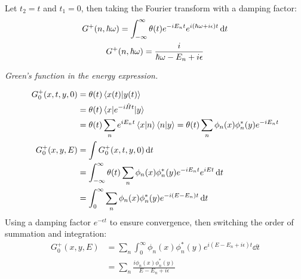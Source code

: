 \documentclass{report}
\begin{document}
\begin{subquests}
\begin{subquests}
		\item Let $t_2 = t$ and $t_1 = 0$, then taking the Fourier transform with a damping factor:
		\begin{gather*}
			G^+(n,\hbar\omega) = \int_{-\infty}^{\infty}\theta(t)e^{-iE_nt}e^{i\pqty{\hbar\omega + i\epsilon}t}\dd{t}\\ 
			G^+(n,\hbar\omega) = \frac{i}{\hbar\omega - E_n + i\epsilon}
		\end{gather*}
	\end{subquests}
	\newpage
	\item \emph{Green's function in the energy expression.}
	\begin{subquests}
		\item 
		\begin{align*}
			G^+_0(x,t,y,0) & = \theta(t)\ip{x(t)}{y(t)} \\
			& = \theta(t)\mel{x}{e^{-i\hat Ht}}{y} \\
			& = \theta(t)\sum_n e^{iE_n t}\ip{x}{n}\ip{n}{y} = \theta(t)\sum_n\phi_{n}(x)\phi_n^*(y)e^{-iE_n t} \\
			G^+_0(x,y,E) & = \int G^+_0(x,t,y,0) \dd{t} \\
			& = \int_{-\infty}^{\infty} \theta(t)\sum_n\phi_{n}(x)\phi_n^*(y)e^{-iE_n t}e^{iEt} \dd{t} \\
			& = \int_{0}^{\infty} \sum_n\phi_{n}(x)\phi_n^*(y)e^{-i(E-E_n)t} \dd{t}
		\end{align*}
		Using a damping factor $e^{-\epsilon t}$ to ensure convergence, then switching the order of summation and integration:
		\begin{align*}
			G^+_0(x,y,E) & = \sum_n\int_{0}^{\infty}\phi_{n}(x)\phi_n^*(y)e^{i(E - E_n + i\epsilon)t} \dd{t}\\
			& = \sum_n \frac{i\phi_{n}(x)\phi_n^*(y)}{E - E_n + i\epsilon}
		\end{align*}
		

\end{subquests}
\end{subquests}
\end{document}
